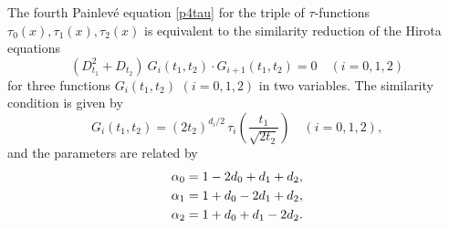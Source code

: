 \begin{prop}\label{simred}
The fourth Painlev\'e equation \eqref{p4tau} for 
the triple of $\tau$-functions 
$\tau_0(x), \tau_1(x), \tau_2(x)$ 
is equivalent to the similarity reduction of the Hirota equations
\begin{equation}
(D_{t_1}^2+D_{t_2} ) \ G_{i}(t_1,t_2) \cdot G_{i+1}(t_1,t_2)=0 
\quad (i=0,1,2)
\end{equation}
for three functions $G_i(t_1,t_2)$ $(i=0,1,2)$ in two variables. 
The similarity condition is given by 
\begin{equation}
G_{i}(t_1,t_2)=(2t_2)^{d_i/2} \, 
\tau_i\left(\frac{t_1}{\sqrt{2t_2}} \right)
\quad(i=0,1,2),
\end{equation}
and the parameters are related by 
\begin{equation}\label{abyd}
\begin{align}
&\alpha_0=1-2d_0+d_1+d_2, \notag \\
&\alpha_1=1+d_0-2d_1+d_2, \\
&\alpha_2=1+d_0+d_1-2d_2. \notag
\end{align}
\end{equation}
\end{prop}

